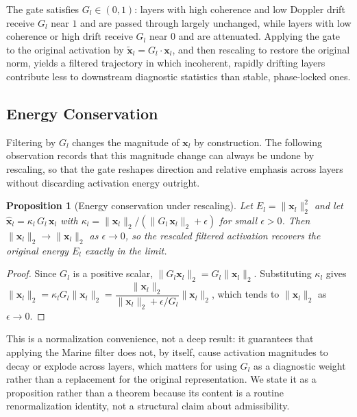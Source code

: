 \documentclass[11pt,twoside,openright]{book}
\numberwithin{equation}{chapter}
\theoremstyle{definition}
\theoremstyle{plain}
\newtheorem{proposition}[definition]{Proposition}
\theoremstyle{remark}
\theoremstyle{definition}
\begin{document}
The gate satisfies $G_l\in(0,1)$: layers with high coherence and low
Doppler drift receive $G_l$ near $1$ and are passed through largely
unchanged, while layers with low coherence or high drift receive $G_l$
near $0$ and are attenuated. Applying the gate to the original activation
by $\tilde{\mathbf{x}}_l=G_l\cdot\mathbf{x}_l$, and then rescaling to
restore the original norm, yields a filtered trajectory in which
incoherent, rapidly drifting layers contribute less to downstream
diagnostic statistics than stable, phase-locked ones.

\subsection{Energy Conservation}

Filtering by $G_l$ changes the magnitude of $\mathbf{x}_l$ by
construction. The following observation records that this magnitude
change can always be undone by rescaling, so that the gate reshapes
direction and relative emphasis across layers without discarding
activation energy outright.

\begin{proposition}[Energy conservation under rescaling]
Let $E_l=\|\mathbf{x}_l\|_2^2$ and let
$\hat{\mathbf{x}}_l=\kappa_l\,G_l\,\mathbf{x}_l$ with
$\kappa_l=\|\mathbf{x}_l\|_2/(\|G_l\,\mathbf{x}_l\|_2+\epsilon)$ for small
$\epsilon>0$. Then $\|\hat{\mathbf{x}}_l\|_2\to\|\mathbf{x}_l\|_2$ as
$\epsilon\to0$, so the rescaled filtered activation recovers the original
energy $E_l$ exactly in the limit.
\end{proposition}

\begin{proof}
Since $G_l$ is a positive scalar, $\|G_l\mathbf{x}_l\|_2=G_l\|\mathbf{x}_l\|_2$.
Substituting $\kappa_l$ gives
$\|\hat{\mathbf{x}}_l\|_2=\kappa_l G_l\|\mathbf{x}_l\|_2=\dfrac{\|\mathbf{x}_l\|_2}{\|\mathbf{x}_l\|_2+\epsilon/G_l}\|\mathbf{x}_l\|_2$,
which tends to $\|\mathbf{x}_l\|_2$ as $\epsilon\to0$.
\end{proof}

This is a normalization convenience, not a deep result: it guarantees
that applying the Marine filter does not, by itself, cause activation
magnitudes to decay or explode across layers, which matters for using
$G_l$ as a diagnostic weight rather than a replacement for the original
representation. We state it as a proposition rather than a theorem
because its content is a routine renormalization identity, not a
structural claim about admissibility.
\end{document}

